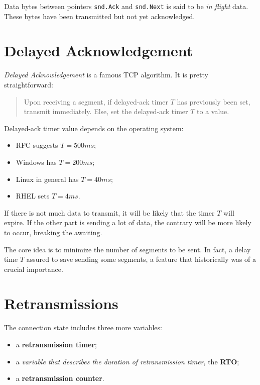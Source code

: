 \documentclass[a4paper, 12pt]{report}
\begin{document}
Data bytes between pointers \texttt{snd.Ack} and \texttt{snd.Next} is said to
be \emph{in flight} data. These bytes have been transmitted but not yet
acknowledged.

\section{Delayed Acknowledgement}

\emph{Delayed Acknowledgement} is a famous TCP algorithm. It is pretty
straightforward:

\begin{quote}
Upon receiving a segment, if delayed-ack timer $T$ has previously been set,
transmit immediately. Else, set the delayed-ack timer $T$ to a value.
\end{quote}

Delayed-ack timer value depends on the operating system:

\begin{itemize}
	\item RFC suggests $T = 500ms$;
	\item Windows has $T = 200ms$;
	\item Linux in general has $T = 40ms$;
	\item RHEL sets $T = 4ms$.
\end{itemize}

If there is not much data to transmit, it will be likely that the timer $T$
will expire. If the other part is sending a lot of data, the contrary will be
more likely to occur, breaking the awaiting.

The core idea is to minimize the number of segments to be sent. In fact, a
delay time $T$ assured to save sending some segments, a feature that
historically was of a crucial importance.

\section{Retransmissions}

The connection state includes three more variables:

\begin{itemize}
	\item a \textbf{retransmission timer};
	\item a \emph{variable that describes the duration of retransmission
		timer}, the \textbf{RTO};
	\item a \textbf{retransmission counter}.
\end{itemize}
\end{document}
